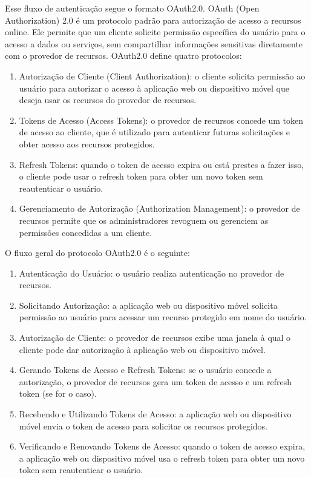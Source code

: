 Esse fluxo de autenticação segue o formato OAuth2.0. OAuth (Open Authorization) 2.0 é um protocolo padrão para autorização de acesso a recursos online. Ele permite que um cliente solicite permissão específica do usuário para o acesso a dados ou serviços, sem compartilhar informações sensitivas diretamente com o provedor de recursos. OAuth2.0 define quatro protocolos:

\begin{enumerate}
  \item Autorização de Cliente (Client Authorization): o cliente solicita permissão ao usuário para autorizar o acesso à aplicação web ou dispositivo móvel que deseja usar os recursos do provedor de recursos.
  \item Tokens de Acesso (Access Tokens): o provedor de recursos concede um token de acesso ao cliente, que é utilizado para autenticar futuras solicitações e obter acesso aos recursos protegidos.
  \item Refresh Tokens: quando o token de acesso expira ou está prestes a fazer isso, o cliente pode usar o refresh token para obter um novo token sem reautenticar o usuário.
  \item Gerenciamento de Autorização (Authorization Management): o provedor de recursos permite que os administradores revoguem ou gerenciem as permissões concedidas a um cliente.
\end{enumerate}

O fluxo geral do protocolo OAuth2.0 é o seguinte:

\begin{enumerate}
  \item Autenticação do Usuário: o usuário realiza autenticação no provedor de recursos.
  \item Solicitando Autorização: a aplicação web ou dispositivo móvel solicita permissão ao usuário para acessar um recurso protegido em nome do usuário.
  \item Autorização de Cliente: o provedor de recursos exibe uma janela à qual o cliente pode dar autorização à aplicação web ou dispositivo móvel.
  \item Gerando Tokens de Acesso e Refresh Tokens: se o usuário concede a autorização, o provedor de recursos gera um token de acesso e um refresh token (se for o caso).
  \item Recebendo e Utilizando Tokens de Acesso: a aplicação web ou dispositivo móvel envia o token de acesso para solicitar os recursos protegidos.
  \item Verificando e Renovando Tokens de Acesso: quando o token de acesso expira, a aplicação web ou dispositivo móvel usa o refresh token para obter um novo token sem reautenticar o usuário.
\end{enumerate}

